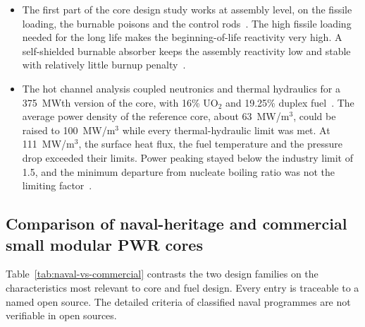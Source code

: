 \begin{itemize}
  \item The first part of the core design study works at assembly
        level, on the fissile loading, the burnable poisons and the
        control rods~\cite{alam_partI_2019}. The high fissile loading
        needed for the long life makes the beginning-of-life reactivity
        very high. A self-shielded burnable absorber keeps the assembly
        reactivity low and stable with relatively little burnup
        penalty~\cite{alam_partI_2019}.

  \item The hot channel analysis coupled neutronics and thermal
        hydraulics for a 375~MWth version of the core, with 16\% UO$_2$
        and 19.25\% duplex fuel~\cite{alam_2019_hotchannel}. The average
        power density of the reference core, about 63~MW/m$^3$, could
        be raised to 100~MW/m$^3$ while every thermal-hydraulic limit was
        met. At 111~MW/m$^3$, the surface heat flux, the fuel temperature
        and the pressure drop exceeded their limits. Power peaking stayed
        below the industry limit of 1.5, and the minimum departure from
        nucleate boiling ratio was not the limiting
        factor~\cite{alam_2019_hotchannel}.
\end{itemize}

\subsection{Comparison of naval-heritage and commercial small modular PWR cores}
\label{subsec:comparison}

Table~\ref{tab:naval-vs-commercial} contrasts the two design families on
the characteristics most relevant to core and fuel design. Every entry
is traceable to a named open source. The detailed criteria of classified
naval programmes are not verifiable in open sources.

